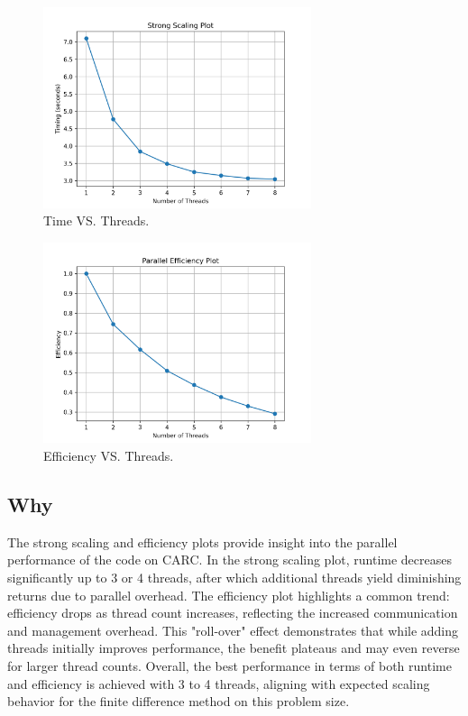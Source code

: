 \documentclass[12pt]{article}
\begin{document}
\begin{figure}[H]
    \centering
    \includegraphics[width=0.7\textwidth]{strong_scaling_plot.png}
    \caption{Time VS. Threads.}
\end{figure}

\begin{figure}[H]
    \centering
    \includegraphics[width=0.7\textwidth]{parallel_efficiency_plot.png}
    \caption{Efficiency VS. Threads.}
\end{figure}

\subsection{Why}
\noindent The strong scaling and efficiency plots provide insight into the parallel performance of the code on CARC. In the strong scaling plot, runtime decreases significantly up to 3 or 4 threads, after which additional threads yield diminishing returns due to parallel overhead. The efficiency plot highlights a common trend: efficiency drops as thread count increases, reflecting the increased communication and management overhead. This "roll-over" effect demonstrates that while adding threads initially improves performance, the benefit plateaus and may even reverse for larger thread counts. Overall, the best performance in terms of both runtime and efficiency is achieved with 3 to 4 threads, aligning with expected scaling behavior for the finite difference method on this problem size.
\end{document}
